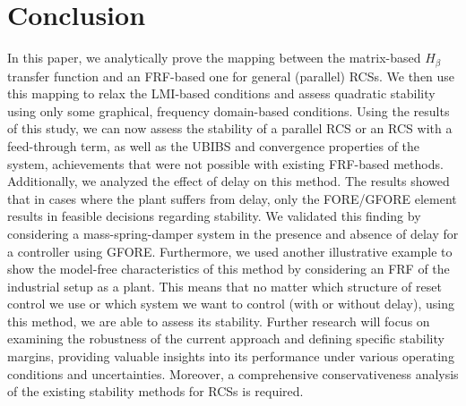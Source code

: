 \section{Conclusion} \label{sec: conclusion}
In this paper, we analytically prove the mapping between the matrix-based $H_\beta$ transfer function and an FRF-based one for general (parallel) RCSs. We then use this mapping to relax the LMI-based conditions and assess quadratic stability using only some graphical, frequency domain-based conditions.
Using the results of this study, we can now assess the stability of a parallel RCS or an RCS with a feed-through term, as well as the UBIBS and convergence properties of the system, achievements that were not possible with existing FRF-based methods. Additionally, we analyzed the effect of delay on this method. The results showed that in cases where the plant suffers from delay, only the FORE/GFORE element results in feasible decisions regarding stability. We validated this finding by considering a mass-spring-damper system in the presence and absence of delay for a controller using GFORE. Furthermore, we used another illustrative example to show the model-free characteristics of this method by considering an FRF of the industrial setup as a plant. This means that no matter which structure of reset control we use or which system we want to control (with or without delay), using this method, we are able to assess its stability. Further research will focus on examining the robustness of the current approach and defining specific stability margins, providing valuable insights into its performance under various operating conditions and uncertainties. Moreover, a comprehensive conservativeness analysis of the existing stability methods for RCSs is required.



